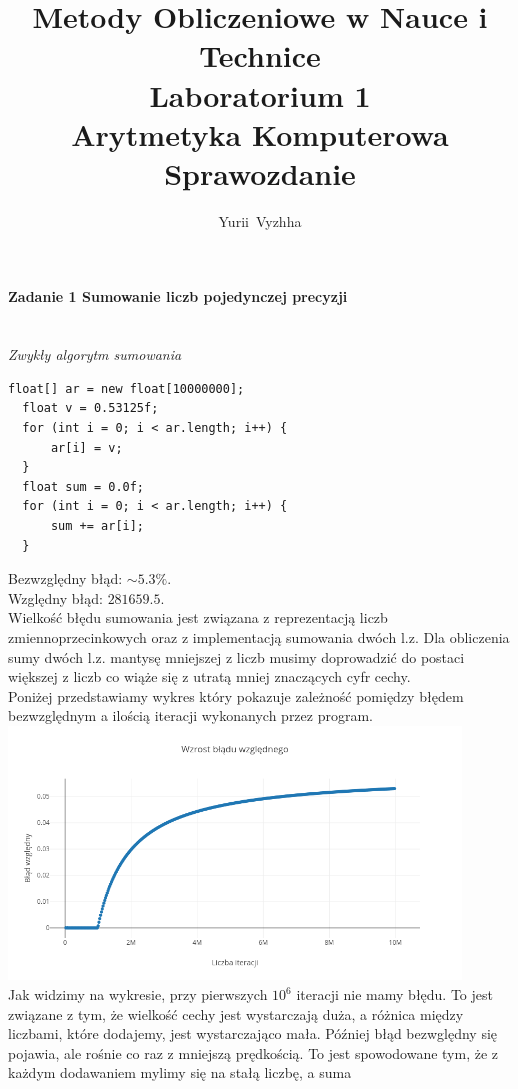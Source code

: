\documentclass[12pt,a4paper]{article}
\author{Yurii~Vyzhha}
\title{Metody Obliczeniowe w Nauce i Technice \\ Laboratorium 1 \\
  Arytmetyka Komputerowa \\ Sprawozdanie}
\begin{document}
  \maketitle
  \paragraph{Zadanie 1 Sumowanie liczb pojedynczej precyzji}\mbox{}\vspace{3mm}\\
  \emph{Zwykły algorytm sumowania}
  \begin{Verbatim}[fontsize=\footnotesize]
  float[] ar = new float[10000000];
  float v = 0.53125f;
  for (int i = 0; i < ar.length; i++) {
      ar[i] = v;
  }
  float sum = 0.0f;
  for (int i = 0; i < ar.length; i++) {
      sum += ar[i];
  }
  \end{Verbatim}
  Bezwzględny błąd: $ \sim 5.3 \%$. \\
  Względny błąd: $ 281659.5$. \\
  Wielkość błędu sumowania jest związana z reprezentacją liczb
  zmiennoprzecinkowych oraz z implementacją sumowania dwóch l.z.
  Dla obliczenia sumy dwóch l.z. mantysę mniejszej z liczb musimy doprowadzić
  do postaci większej z liczb co wiąże się z utratą mniej znaczących cyfr
  cechy. \\
  Poniżej przedstawiamy wykres który pokazuje zależność pomiędzy błędem
  bezwzględnym a ilością iteracji wykonanych przez program.\\
  \includegraphics[width=0.9\textwidth]{img/Plot1} \\
  Jak widzimy na wykresie, przy pierwszych $10^6$ iteracji nie mamy błędu.
  To jest związane z tym, że wielkość cechy jest wystarczają duża, a różnica
  między liczbami, które dodajemy, jest wystarczająco mała. Później błąd
  bezwględny się pojawia, ale rośnie co raz z mniejszą prędkością. To jest
  spowodowane tym, że z każdym dodawaniem mylimy się na stałą liczbę, a suma
\end{document}
